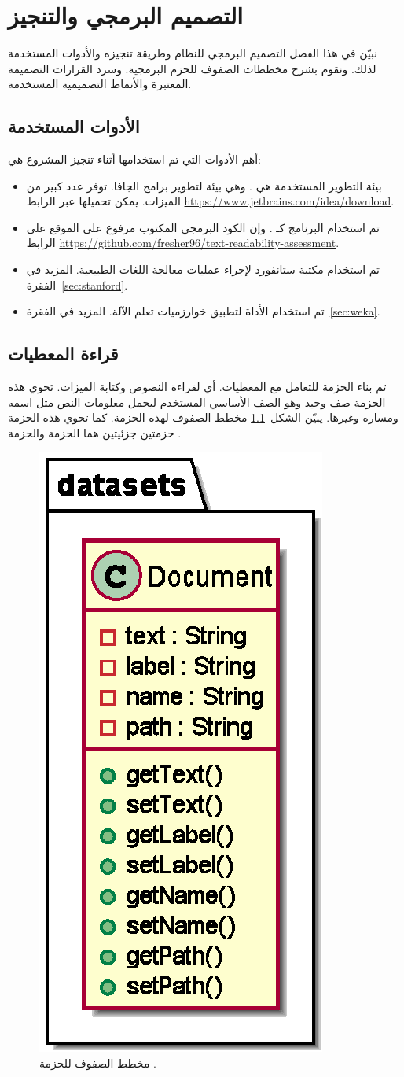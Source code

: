 

\chapter{التصميم البرمجي والتنجيز}
نبيّن في هذا الفصل التصميم البرمجي للنظام وطريقة تنجيزه والأدوات المستخدمة لذلك.
ونقوم بشرح مخططات الصفوف للحزم البرمجية.
وسرد القرارات التصميمة المعتبرة والأنماط التصميمية  المستخدمة.


\section{الأدوات المستخدمة}
أهم الأدوات التي تم استخدامها أثناء تنجيز المشروع هي:
\begin{itemize}
	\item 
	بيئة التطوير المستخدمة هي  .
	وهي بيئة لتطوير برامج الجافا.
	توفر عدد كبير من الميزات.
	يمكن تحميلها عبر الرابط
	\url{https://www.jetbrains.com/idea/download}.
	
	\item
	تم استخدام البرنامج  كـ .
	وإن الكود البرمجي المكتوب مرفوع على الموقع  على الرابط
	\url{https://github.com/fresher96/text-readability-assessment}.
	
	\item
	تم استخدام مكتبة ستانفورد  لإجراء عمليات معالجة اللغات الطبيعية.
	المزيد في الفقرة~\ref{sec:stanford}.
	
	\item 
	تم استخدام الأداة  لتطبيق خوارزميات تعلم الآلة.
	المزيد في الفقرة~\ref{sec:weka}.
\end{itemize}


\section{قراءة المعطيات}
تم بناء الحزمة  للتعامل مع المعطيات. أي لقراءة النصوص وكتابة الميزات.
تحوي هذه الحزمة صف وحيد  وهو الصف الأساسي المستخدم ليحمل معلومات النص مثل اسمه ومساره وغيرها.
يبيّن الشكل~\ref{fig:cd:datasets} مخطط الصفوف لهذه الحزمة.
كما تحوي هذه الحزمة حزمتين جزئيتين هما الحزمة  والحزمة .

\begin{figure}[htb]
	\centering
	\includegraphics[width=0.25\linewidth]{images/cd-datasets.eps}
	\caption{%
		مخطط الصفوف للحزمة .
	}
	\label{fig:cd:datasets}
\end{figure}

